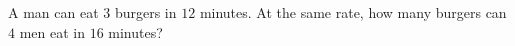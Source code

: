 A man can eat $3$ burgers in $12$ minutes. At the same rate, how many burgers can $4$ men eat in $16$ minutes?
